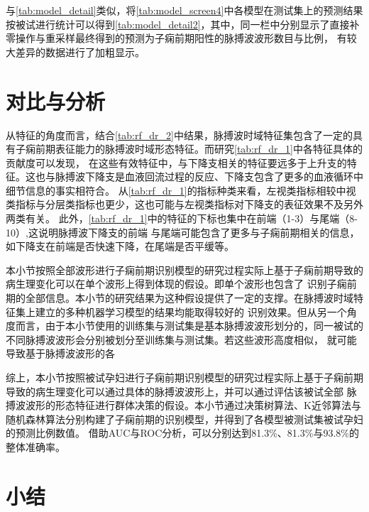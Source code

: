 与\autoref{tab:model_detail}类似，将\autoref{tab:model_screen4}中各模型在测试集上的预测结果按被试进行统计可以得到\autoref{tab:model_detail2}，其中，同一栏中分别显示了直接补零操作与重采样最终得到的预测为子痫前期阳性的脉搏波波形数目与比例，
有较大差异的数据进行了加粗显示。

\section{对比与分析}

从特征的角度而言，结合\autoref{tab:rf_dr_2}中结果，脉搏波时域特征集包含了一定的具有子痫前期表征能力的脉搏波时域形态特征。而研究\autoref{tab:rf_dr_1}中各特征具体的贡献度可以发现，
在这些有效特征中，与下降支相关的特征要远多于上升支的特征。这也与脉搏波下降支是血液回流过程的反应、下降支包含了更多的血液循环中细节信息的事实相符合。
从\autoref{tab:rf_dr_1}的指标种类来看，左视类指标相较中视类指标与分层类指标也更少，这也可能与左视类指标对下降支的表征效果不及另外两类有关。
此外，\autoref{tab:rf_dr_1}中的特征的下标也集中在前端（1-3）与尾端（8-10）,这说明脉搏波下降支的前端
与尾端可能包含了更多与子痫前期相关的信息，如下降支在前端是否快速下降，在尾端是否平缓等。

本小节按照全部波形进行子痫前期识别模型的研究过程实际上基于子痫前期导致的病生理变化可以在单个波形上得到体现的假设。即单个波形也包含了
识别子痫前期的全部信息。本小节的研究结果为这种假设提供了一定的支撑。在脉搏波时域特征集上建立的多种机器学习模型的结果均能取得较好的
识别效果。但从另一个角度而言，由于本小节使用的训练集与测试集是基本脉搏波波形划分的，同一被试的不同脉搏波波形会分别被划分至训练集与测试集。若这些波形高度相似，
就可能导致基于脉搏波波形的各

综上，本小节按照被试孕妇进行子痫前期识别模型的研究过程实际上基于子痫前期导致的病生理变化可以通过具体的脉搏波波形上，并可以通过评估该被试全部
脉搏波波形的形态特征进行群体决策的假设。本小节通过决策树算法、K近邻算法与随机森林算法分别构建了子痫前期的识别模型，并得到了各模型被测试集被试孕妇的预测比例数值。
借助AUC与ROC分析，可以分别达到81.3\%、81.3\%与93.8\%的整体准确率。

\section{小结}